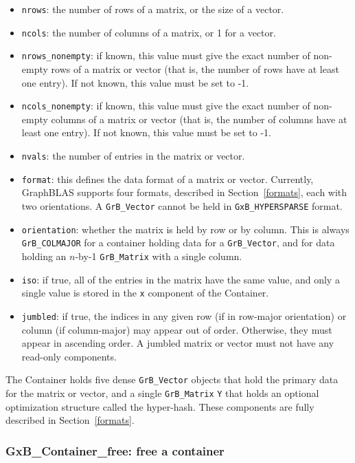 \begin{itemize}
\item \verb'nrows': the number of rows of a matrix, or the size of a vector.
\item \verb'ncols': the number of columns of a matrix, or 1 for a vector.
\item \verb'nrows_nonempty':  if known, this value must give the exact number
    of non-empty rows of a matrix or vector (that is, the number of
    rows have at least one entry).  If not known, this value must be
    set to -1.
\item \verb'ncols_nonempty':  if known, this value must give the exact number
    of non-empty columns of a matrix or vector (that is, the number of
    columns have at least one entry).  If not known, this value must be
    set to -1.
\item \verb'nvals': the number of entries in the matrix or vector.
\item \verb'format': this defines the data format of a matrix or vector.
    Currently, GraphBLAS supports four formats, described in
    Section~\ref{formats}, each with two orientations.  A \verb'GrB_Vector'
    cannot be held in \verb'GxB_HYPERSPARSE' format.
\item \verb'orientation':  whether the matrix is held by row or by column.
    This is always \verb'GrB_COLMAJOR' for a container holding data for a
    \verb'GrB_Vector', and for data holding an $n$-by-1 \verb'GrB_Matrix'
    with a single column.
\item \verb'iso': if true, all of the entries in the matrix have the same
    value, and only a single value is stored in the \verb'x' component of
    the Container.
\item \verb'jumbled': if true, the indices in any given row (if in row-major
    orientation) or column (if column-major) may appear out of order.
    Otherwise, they must appear in ascending order.
    A jumbled matrix or vector must not have any read-only components.
\end{itemize}

The Container holds five dense \verb'GrB_Vector' objects that hold the primary
data for the matrix or vector, and a single \verb'GrB_Matrix' \verb'Y' that
holds an optional optimization structure called the hyper-hash.  These
components are fully described in Section~\ref{formats}.

\newpage
\subsubsection{{\sf GxB\_Container\_free:} free a container}
\label{container_free}

